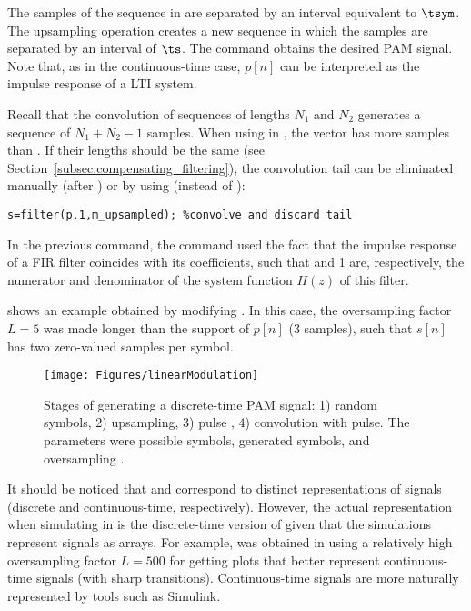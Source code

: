 The samples of the sequence  in  are separated by an interval equivalent to $\tsym$. The upsampling operation creates a new sequence  in which the samples are separated by an interval of $\ts$. 
The command  obtains the desired PAM signal. Note that, as in the continuous-time case, $p[n]$ can be interpreted as the impulse response of a LTI system. %

Recall that the convolution of sequences of lengths $N_1$ and $N_2$ generates a sequence of $N_1+N_2-1$ samples. When using  in , the vector  has more samples than . If their lengths should be the same (see Section~\ref{subsec:compensating_filtering}), the convolution tail can be eliminated manually (after ) or by using  (instead of ):
\begin{lstlisting}
s=filter(p,1,m_upsampled); %convolve and discard tail
\end{lstlisting}
In the previous command, the  command used the fact that the impulse response  of a FIR filter coincides with its coefficients, such that  and 1 are, respectively, the numerator and denominator of the system function $H(z)$ of this filter.

 shows an example obtained by modifying . In this case, the oversampling factor $L=5$ was made longer than the support of $p[n]$ (3 samples), such that $s[n]$ has two zero-valued samples per symbol.

\begin{figure}[htbp]
\centering
\texttt{[image: Figures/linearModulation]}
\caption[{Stages of generating a discrete-time PAM signal.}]{Stages of generating a discrete-time PAM signal: 1) random symbols, 2) upsampling, 3) pulse , 4) convolution with pulse. The parameters were  possible symbols,  generated symbols, and oversampling .\label{fig:linearModulation}}
\end{figure}

It should be noticed that  and  correspond to distinct representations of signals (discrete and continuous-time, respectively). However, the actual representation when simulating in {\matlab} is the discrete-time version of  given that the simulations represent signals as arrays. For example, 
was obtained in {\matlab} using a relatively high oversampling factor $L=500$ for getting plots that better represent continuous-time signals (with sharp transitions).
Continuous-time signals are more naturally represented by tools such as Simulink.

